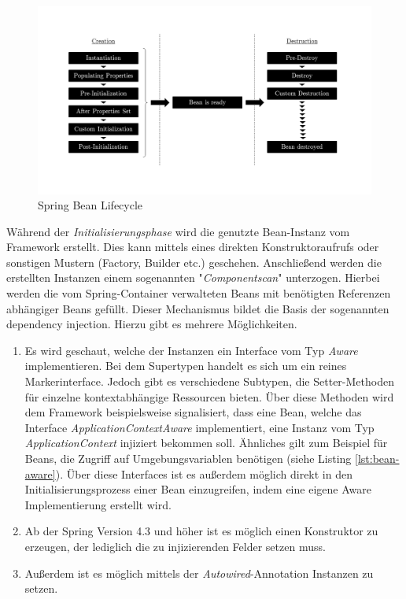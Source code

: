 \begin{figure}[ht!]
	\centering
	\includegraphics[width=\linewidth]{kapitel/ergebnisanalyse/_img/bean-lifecycle}
	\caption[Bean Lifecycle]{Spring Bean Lifecycle \cite{bean-lifecycle}}
	\label{fig:bean-init}
\end{figure}

Während der \emph{Initialisierungsphase} wird die genutzte Bean-Instanz vom Framework erstellt. Dies kann mittels eines direkten Konstruktoraufrufs oder sonstigen Mustern (Factory, Builder etc.) geschehen. Anschließend werden die erstellten Instanzen einem sogenannten "\emph{Componentscan}" unterzogen. Hierbei werden die vom Spring-Container verwalteten Beans mit benötigten Referenzen abhängiger Beans gefüllt. Dieser Mechanismus bildet die Basis der sogenannten dependency injection. Hierzu gibt es mehrere Möglichkeiten. 

\begin{enumerate}

	\item Es wird geschaut, welche der Instanzen ein Interface vom Typ \emph{Aware} implementieren. Bei dem Supertypen handelt es sich um ein reines Markerinterface. Jedoch gibt es verschiedene Subtypen, die Setter-Methoden für einzelne kontextabhängige Ressourcen bieten. Über diese Methoden wird dem Framework beispielsweise signalisiert, dass eine Bean, welche das Interface \emph{ApplicationContextAware} implementiert, eine Instanz vom Typ \emph{ApplicationContext} injiziert bekommen soll. Ähnliches gilt zum Beispiel für Beans, die Zugriff auf Umgebungsvariablen benötigen (siehe Listing \ref{lst:bean-aware}). Über diese Interfaces ist es außerdem möglich direkt in den Initialisierungsprozess einer Bean einzugreifen, indem eine eigene Aware Implementierung erstellt wird.

	\item Ab der Spring Version 4.3 und höher ist es möglich einen Konstruktor zu erzeugen, der lediglich die zu injizierenden Felder setzen muss.

	\item Außerdem ist es möglich mittels der \emph{Autowired}-Annotation Instanzen zu setzen.
	
\end{enumerate}

